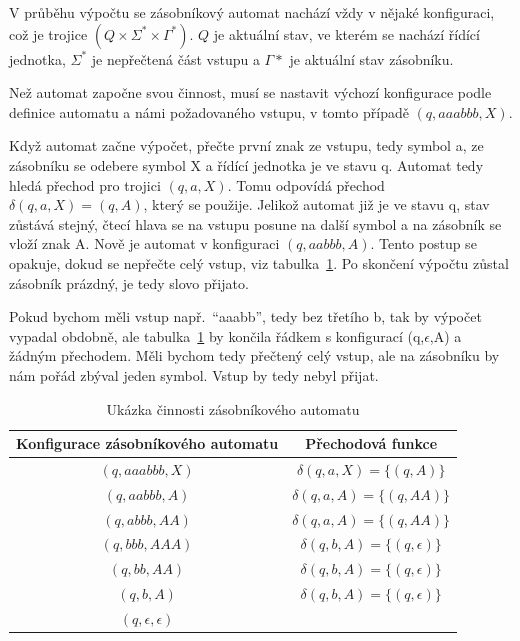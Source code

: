 V průběhu výpočtu se zásobníkový automat nachází vždy v nějaké konfiguraci, což je trojice $(Q \times \Sigma^{*} \times \Gamma^{*})$.\cite{Kozen1997} $Q$ je aktuální stav, ve kterém se nachází řídící jednotka, $\Sigma^{*}$ je nepřečtená část vstupu a $\Gamma{*}$ je aktuální stav zásobníku. 

Než automat započne svou činnost, musí se nastavit výchozí konfigurace podle definice automatu a námi požadovaného vstupu, v tomto případě $(q,aaabbb,X)$. 

Když automat začne výpočet, přečte první znak ze vstupu, tedy symbol a, ze zásobníku se odebere symbol X a řídící jednotka je ve stavu q. Automat tedy hledá přechod pro trojici $(q,a,X)$. Tomu odpovídá přechod $\delta(q,a,X) = (q,A)$, který se použije. Jelikož automat již je ve stavu q, stav zůstává stejný, čtecí hlava se na vstupu posune na další symbol a na zásobník se vloží znak A. Nově je automat v konfiguraci $(q,aabbb,A)$. Tento postup se opakuje, dokud se nepřečte celý vstup, viz tabulka~\ref{tab:DemonstationOfPDA}.\cite{Kozen1997} Po skončení výpočtu zůstal zásobník prázdný, je tedy slovo přijato. 

Pokud bychom měli vstup např.\ ``aaabb'', tedy bez třetího b, tak by výpočet vypadal obdobně, ale tabulka~\ref{tab:DemonstationOfPDA} by končila řádkem s konfigurací (q,$\epsilon$,A) a žádným přechodem. Měli bychom tedy přečtený celý vstup, ale na zásobníku by nám pořád zbýval jeden symbol. Vstup by tedy nebyl přijat.

\begin{table}[h]
    \centering
    \begin{tabular}{c|c}
        Konfigurace zásobníkového automatu & Přechodová funkce \\
        \hline
        $(q,aaabbb,X)$ & $\delta(q,a,X) = \{(q,A)\}$ \\
        $(q,aabbb,A)$ & $\delta(q,a,A) = \{(q,AA)\}$ \\
        $(q,abbb,AA)$ & $\delta(q,a,A) = \{(q,AA)\}$ \\
        $(q,bbb,AAA)$ & $\delta(q,b,A) = \{(q,\epsilon)\}$ \\
        $(q,bb,AA)$ & $\delta(q,b,A) = \{(q,\epsilon)\}$ \\
        $(q,b,A)$ & $\delta(q,b,A) = \{(q,\epsilon)\}$ \\
        $(q,\epsilon,\epsilon)$ &  \\
    \end{tabular}
    \caption{Ukázka činnosti zásobníkového automatu }\label{tab:DemonstationOfPDA}
\end{table}

\endinput